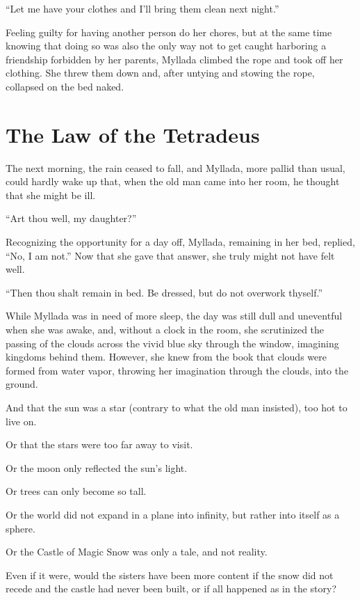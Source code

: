 ``Let me have your clothes and I'll bring them clean next night.''

Feeling guilty for having another person do her chores, but at the same time knowing that doing so was also the only way not to get caught harboring a friendship forbidden by her parents, Myllada climbed the rope and took off her clothing. She threw them down and, after untying and stowing the rope, collapsed on the bed naked.

\chapter{The Law of the Tetradeus}

The next morning, the rain ceased to fall, and Myllada, more pallid than usual, could hardly wake up that, when the old man came into her room, he thought that she might be ill.

``Art thou well, my daughter?''

Recognizing the opportunity for a day off, Myllada, remaining in her bed, replied, ``No, I am not.'' Now that she gave that answer, she truly might not have felt well.

``Then thou shalt remain in bed. Be dressed, but do not overwork thyself.''

\centeredstars

While Myllada was in need of more sleep, the day was still dull and uneventful when she was awake, and, without a clock in the room, she scrutinized the passing of the clouds across the vivid blue sky through the window, imagining kingdoms behind them. However, she knew from the book that clouds were formed from water vapor, throwing her imagination through the clouds, into the ground.

And that the sun was a star (contrary to what the old man insisted), too hot to live on.

Or that the stars were too far away to visit.

Or the moon only reflected the sun's light.

Or trees can only become so tall.

Or the world did not expand in a plane into infinity, but rather into itself as a sphere.

Or the Castle of Magic Snow was only a tale, and not reality.

Even if it were, would the sisters have been more content if the snow did not recede and the castle had never been built, or if all happened as in the story?

